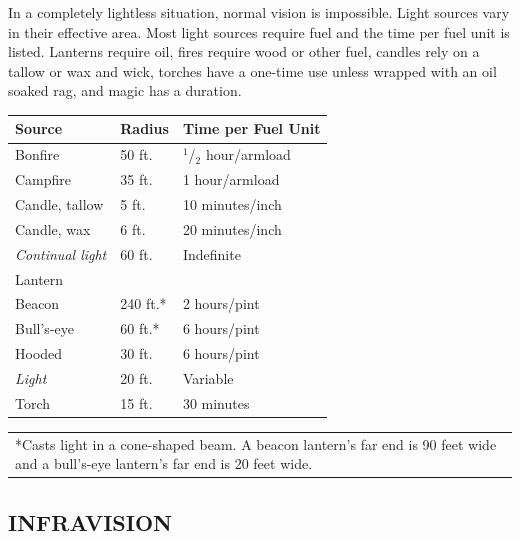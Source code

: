 \begin{multicols}{2}
In a completely lightless situation, normal vision is impossible.  Light sources vary in their effective area.  Most light sources require fuel and the time per fuel unit is listed.  Lanterns require oil, fires require wood or other fuel, candles rely on a tallow or wax and wick, torches have a one-time use unless wrapped with an oil soaked rag, and magic has a duration.

\noindent
\begin{minipage}{\columnwidth}

\label{lightsources}
\noindent
\begin{tabular}{|p{}|p{}|p{}|}
\hline
Source			& Radius	& Time per Fuel Unit \\
\hline\hline
\rowcolor[gray]{.9}Bonfire			& 50 ft.	& $^1$/$_2$ hour/armload \\
Campfire		& 35 ft.	& 1 hour/armload \\
\rowcolor[gray]{.9}Candle, tallow	& 5 ft.		& 10 minutes/inch \\
Candle, wax		& 6 ft.		& 20 minutes/inch \\
\rowcolor[gray]{.9}\textit{Continual light}	& 60 ft.	& Indefinite \\
Lantern			& 			& \\
\hspace{2em}Beacon		& 240 ft.*	& 2 hours/pint \\
\rowcolor[gray]{.9}\hspace{2em}Bull's-eye	& 60 ft.*	& 6 hours/pint \\
\hspace{2em}Hooded		& 30 ft.	& 6 hours/pint \\
\rowcolor[gray]{.9}\textit{Light}			& 20 ft.	& Variable \\
Torch			& 15 ft.	& 30 minutes \\
\hline
\end{tabular}
\noindent\begin{tabular}{p{}}
*Casts light in a cone-shaped beam.  A beacon lantern's far end is 90 feet wide and a bull's-eye lantern's far end is 20 feet wide. \\
\end{tabular}\vspace{.5em}

\end{minipage}

\subsection{INFRAVISION}


\end{multicols}
